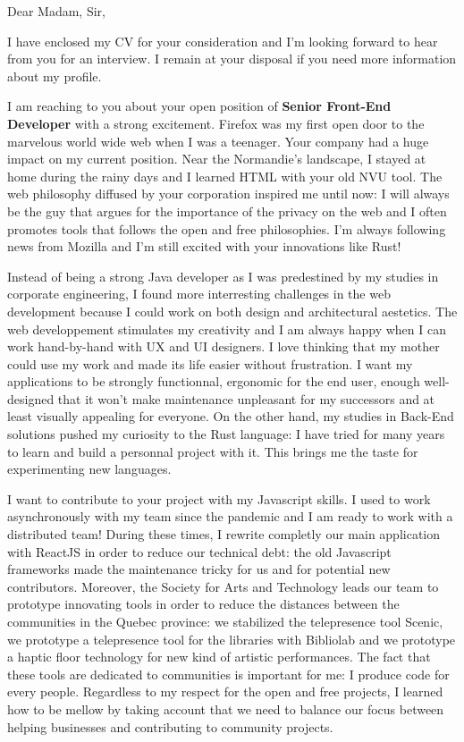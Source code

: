
\date{August 6, 2021}
\opening{Dear Madam, Sir,}

\closing{I have enclosed my CV for your consideration and I'm looking forward to hear from you for an interview. I remain at your disposal if you need more information about my profile.}


\makelettertitle

I am reaching to you about your open position of \textbf{Senior Front-End Developer} with a strong excitement. Firefox was my first open door to the marvelous world wide web when I was a teenager. Your company had a huge impact on my current position. Near the Normandie's landscape, I stayed at home during the rainy days and I learned HTML with your old NVU tool. The web philosophy diffused by your corporation inspired me until now: I will always be the guy that argues for the importance of the privacy on the web and I often promotes tools that follows the open and free philosophies. I'm always following news from Mozilla and I'm still excited with your innovations like Rust!

Instead of being a strong Java developer as I was predestined by my studies in corporate engineering, I found more interresting challenges in the web development because I could work on both design and architectural aestetics. The web developpement stimulates my creativity and I am always happy when I can work hand-by-hand with UX and UI designers. I love thinking that my mother could use my work and made its life easier without frustration. I want my applications to be strongly functionnal, ergonomic for the end user, enough well-designed that it won't make maintenance unpleasant for my successors and at least visually appealing for everyone. On the other hand, my studies in Back-End solutions pushed my curiosity to the Rust language: I have tried for many years to learn and build a personnal project with it. This brings me the taste for experimenting new languages.

I want to contribute to your project with my Javascript skills. I used to work asynchronously with my team since the pandemic and I am ready to work with a distributed team! During these times, I rewrite completly our main application with ReactJS in order to reduce our technical debt: the old Javascript frameworks made the maintenance tricky for us and for potential new contributors. Moreover, the Society for Arts and Technology leads our team to prototype innovating tools in order to reduce the distances between the communities in the Quebec province: we stabilized the telepresence tool Scenic, we prototype a telepresence tool for the libraries with Bibliolab and we prototype a haptic floor technology for new kind of artistic performances. The fact that these tools are dedicated to communities is important for me: I produce code for every people. Regardless to my respect for the open and free projects, I learned how to be mellow by taking account that we need to balance our focus between helping businesses and contributing to community projects.

